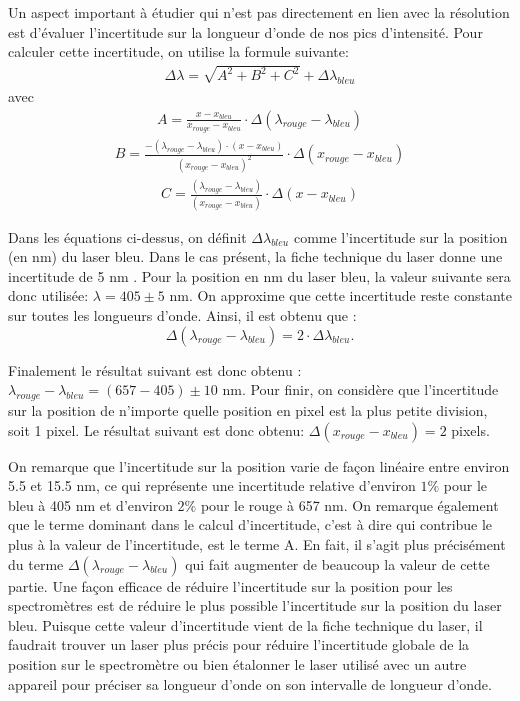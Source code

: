 \documentclass[11pt,letterpaper]{article}
\begin{document}
Un aspect important à étudier qui n'est pas directement en lien avec la résolution est d'évaluer l'incertitude sur 
la longueur d'onde de nos pics d'intensité. Pour calculer cette incertitude, on utilise la formule suivante: 
\begin{align}
  \Delta \lambda =\sqrt{A^{2}+B^{2}+C^{2}}+\Delta \lambda _{bleu}
\end{align}
avec 
\begin{align}
  A=\frac{x-x_{bleu}}{x_{rouge}-x_{bleu}}\cdot \Delta\left ( \lambda _{rouge}-\lambda _{bleu} \right )
\end{align}
\begin{align}
  B=\frac{-(\lambda _{rouge}-\lambda _{bleu})\cdot (x-x_{bleu})}{(x_{rouge}-x_{bleu})^{2}} \cdot \Delta \left ( x_{rouge}-x_{bleu} \right )
\end{align}
\begin{align}\label{eq5}
  C=\frac{(\lambda _{rouge}-\lambda _{bleu})}{(x_{rouge}-x_{bleu})}\cdot \Delta (x-x_{bleu})
\end{align}

Dans les équations ci-dessus, on définit $\Delta \lambda _{bleu}$ comme l'incertitude sur la position (en nm)
du laser bleu. Dans le cas présent, la fiche technique du laser donne une incertitude de 5 nm \cite{noauthor_compact_2024} . Pour la position en nm du laser bleu,
la valeur suivante sera donc utilisée: $ \lambda = 405\pm 5$ nm. On approxime que cette incertitude reste constante sur 
toutes les longueurs d'onde. Ainsi, il est obtenu que :
\begin{equation}
  \Delta\left ( \lambda _{rouge}-\lambda _{bleu} \right )=2\cdot \Delta \lambda _{bleu}. 
\end{equation}

Finalement le résultat suivant est donc obtenu : $\lambda _{rouge}-\lambda _{bleu}= (657-405)\pm 10$ nm.
Pour finir, on considère que l'incertitude sur la position de n'importe quelle position en pixel est la plus petite
division, soit 1 pixel. Le résultat suivant est donc obtenu: $\Delta \left ( x_{rouge}-x_{bleu} \right )=2$ pixels.

On remarque que l’incertitude sur la position varie de façon linéaire entre environ 5.5 et 15.5 nm, ce qui représente une
incertitude relative d'environ $1\%$ pour le bleu à 405 nm et d'environ $2\%$ pour le rouge à 657 nm. On remarque 
également que le terme dominant dans le calcul d'incertitude, 
c'est à dire qui contribue le plus à la valeur de l'incertitude, est le terme A. 
En fait, il s’agit plus précisément du terme $\Delta\left ( \lambda _{rouge}-\lambda _{bleu} \right )$ qui fait augmenter de beaucoup
la valeur de cette partie. Une façon efficace de réduire l'incertitude sur la position pour
les spectromètres est de réduire le plus possible l’incertitude sur la position du laser bleu. Puisque cette valeur d'incertitude
vient de la fiche technique du laser, il faudrait trouver un laser plus précis pour réduire l'incertitude 
globale de la position sur le spectromètre ou bien étalonner le laser utilisé avec un autre appareil pour préciser
sa longueur d'onde on son intervalle de longueur d'onde. 
\end{document}
